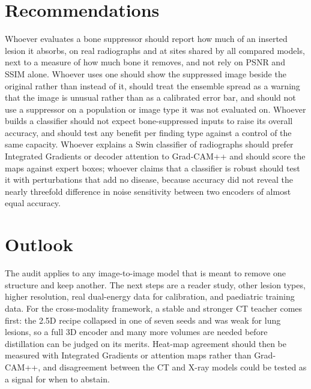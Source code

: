 \section{Recommendations}
Whoever evaluates a bone suppressor should report how much of an inserted lesion it absorbs, on real radiographs and at sites shared by all
compared models, next to a measure of how much bone it removes, and not rely on PSNR and SSIM alone. Whoever uses one should show the
suppressed image beside the original rather than instead of it, should treat the ensemble spread as a warning that the image is unusual rather
than as a calibrated error bar, and should not use a suppressor on a population or image type it was not evaluated on. Whoever builds a
classifier should not expect bone-suppressed inputs to raise its overall accuracy, and should test any benefit per finding type against a
control of the same capacity. Whoever explains a Swin classifier of radiographs should prefer Integrated Gradients or decoder attention to
Grad-CAM++ and should score the maps against expert boxes; whoever claims that a classifier is robust should test it with perturbations that
add no disease, because accuracy did not reveal the nearly threefold difference in noise sensitivity between two encoders of almost equal
accuracy.

\section{Outlook}
The audit applies to any image-to-image model that is meant to remove one structure and keep another. The next steps are a reader study, other
lesion types, higher resolution, real dual-energy data for calibration, and paediatric training data. For the cross-modality framework, a
stable and stronger CT teacher comes first: the 2.5D recipe collapsed in one of seven seeds and was weak for lung lesions, so a full 3D
encoder and many more volumes are needed before distillation can be judged on its merits. Heat-map agreement should then be measured with
Integrated Gradients or attention maps rather than Grad-CAM++, and disagreement between the CT and X-ray models could be tested as a signal
for when to abstain.
